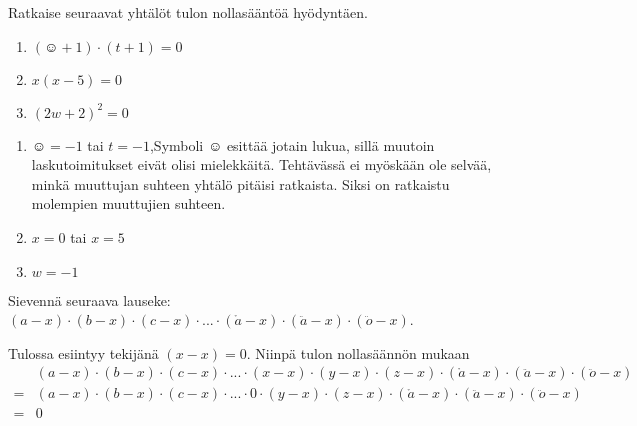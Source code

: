 \begin{tehtava}
    Ratkaise seuraavat yhtälöt tulon nollasääntöä hyödyntäen.
    \begin{enumerate}
        \item $(\smiley{}+1)\cdot (t+1)=0$
        \item $x(x-5)=0$
        \item $(2w+2)^2=0$
    \end{enumerate}
    \begin{vastaus}
        \begin{enumerate}
            \item $\smiley{}=-1$ tai $t=-1$,\qquad  Symboli $\smiley{}$ esittää jotain lukua, sillä muutoin laskutoimitukset eivät olisi mielekkäitä. Tehtävässä ei myöskään ole selvää, minkä muuttujan suhteen yhtälö pitäisi ratkaista. Siksi on ratkaistu molempien muuttujien suhteen.
            \item $x=0$ tai $x=5$
            \item $w=-1$
        \end{enumerate}
    \end{vastaus}
\end{tehtava}

\begin{tehtava}
	Sievennä seuraava lauseke: $(a-x)\cdot(b-x)\cdot(c-x)\cdot...\cdot(\mathring{a}-x)\cdot(\ddot{a}-x)\cdot(\ddot{o}-x)$.
    \begin{vastaus}
		Tulossa esiintyy tekijänä $(x-x)=0$. Niinpä tulon nollasäännön mukaan
		\begin{align*}
 			&(a-x)\cdot(b-x)\cdot(c-x)\cdot...\cdot(x-x)\cdot(y-x)\cdot(z-x)\cdot(\mathring{a}-x)\cdot(\ddot{a}-x)\cdot(\ddot{o}-x) \\
 			=&(a-x)\cdot(b-x)\cdot(c-x)\cdot...\cdot 0\cdot(y-x)\cdot(z-x)\cdot(\mathring{a}-x)\cdot(\ddot{a}-x)\cdot(\ddot{o}-x) \\
 			=&0
		\end{align*}
   \end{vastaus}
\end{tehtava}
